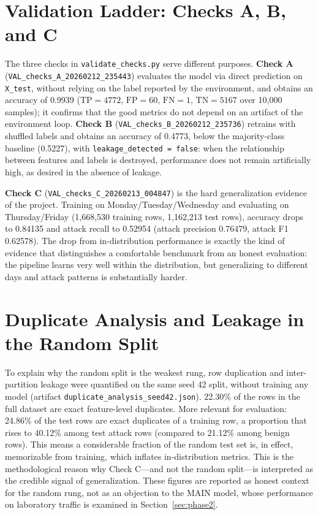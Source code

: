 \section{Validation Ladder: Checks A, B, and C}
The three checks in \texttt{validate\_checks.py} serve different purposes. \textbf{Check A} (\texttt{VAL\_checks\_A\_20260212\_235443}) evaluates the model via direct prediction on \texttt{X\_test}, without relying on the label reported by the environment, and obtains an accuracy of 0.9939 ($\mathrm{TP}=4772$, $\mathrm{FP}=60$, $\mathrm{FN}=1$, $\mathrm{TN}=5167$ over 10,000 samples); it confirms that the good metrics do not depend on an artifact of the environment loop. \textbf{Check B} (\texttt{VAL\_checks\_B\_20260212\_235736}) retrains with shuffled labels and obtains an accuracy of 0.4773, below the majority-class baseline (0.5227), with \texttt{leakage\_detected = false}: when the relationship between features and labels is destroyed, performance does not remain artificially high, as desired in the absence of leakage.

\textbf{Check C} (\texttt{VAL\_checks\_C\_20260213\_004847}) is the hard generalization evidence of the project. Training on Monday/Tuesday/Wednesday and evaluating on Thursday/Friday (1,668,530 training rows, 1,162,213 test rows), accuracy drops to 0.84135 and attack recall to 0.52954 (attack precision 0.76479, attack F1 0.62578). The drop from in-distribution performance is exactly the kind of evidence that distinguishes a comfortable benchmark from an honest evaluation: the pipeline learns very well within the distribution, but generalizing to different days and attack patterns is substantially harder.

\section{Duplicate Analysis and Leakage in the Random Split}
\label{sec:duplicates}
To explain why the random split is the weakest rung, row duplication and inter-partition leakage were quantified on the same seed 42 split, without training any model (artifact \texttt{duplicate\_analysis\_seed42.json}). 22.30\% of the rows in the full dataset are exact feature-level duplicates. More relevant for evaluation: 24.86\% of the test rows are exact duplicates of a training row, a proportion that rises to 40.12\% among test attack rows (compared to 21.12\% among benign rows). This means a considerable fraction of the random test set is, in effect, memorizable from training, which inflates in-distribution metrics. This is the methodological reason why Check C---and not the random split---is interpreted as the credible signal of generalization. These figures are reported as honest context for the random rung, not as an objection to the MAIN model, whose performance on laboratory traffic is examined in Section~\ref{sec:phase2}.

